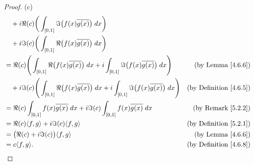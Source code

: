 \begin{proof}{(c)}
\begin{align*}
         & \quad + i \Re(c) \bigg(\int_{[0, 1]} \Im\big(f(x) \overline{g(x)}\big) \; dx\bigg)                                                                                                                          \\
         & \quad + i \Im(c) \bigg(\int_{[0, 1]} \Re\big(f(x) \overline{g(x)}\big) \; dx\bigg)                                                                                                                          \\
         & = \Re(c) \Bigg(\int_{[0, 1]} \Re\big(f(x) \overline{g(x)}\big) \; dx + i \int_{[0, 1]} \Im\big(f(x) \overline{g(x)}\big) \; dx\Bigg)         & \text{(by Lemma \ref{4.6.6})}                                \\
         & \quad + i \Im(c) \Bigg(\int_{[0, 1]} \Re\big(f(x) \overline{g(x)}\big) \; dx + i \int_{[0, 1]} \Im\big(f(x) \overline{g(x)}\big) \; dx\Bigg) & \text{(by Definition \ref{4.6.5})}                           \\
         & = \Re(c) \int_{[0, 1]} f(x) \overline{g(x)} \; dx + i \Im(c) \int_{[0, 1]} f(x) \overline{g(x)} \; dx                                        & \text{(by Remark \ref{5.2.2})}                               \\
         & = \Re(c) \inner*{f, g} + i \Im(c) \inner*{f, g}                                                                                              & \text{(by Definition \ref{5.2.1})}                           \\
         & = \big(\Re(c) + i \Im(c)\big) \inner*{f, g}                                                                                                  & \text{(by Lemma \ref{4.6.6})}                                \\
         & = c \inner*{f, g}.                                                                                                                           & \text{(by Definition \ref{4.6.8})}
    \end{align*}
\end{proof}

